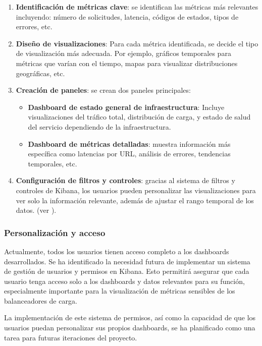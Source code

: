 \begin{enumerate}
    \item \textbf{Identificación de métricas clave}: se identifican las
    métricas más relevantes incluyendo: número de solicitudes, latencia,
	códigos de estados, tipos de errores, etc.

    \item \textbf{Diseño de visualizaciones}: Para cada métrica identificada,
    se decide el tipo de visualización más adecuada. Por ejemplo, gráficos
	temporales para métricas que varían con el tiempo, mapas para visualizar
	distribuciones geográficas, etc.

    \item \textbf{Creación de paneles}: se crean dos paneles principales:
    \begin{itemize}
        \item \textbf{Dashboard de estado general de infraestructura}: Incluye
        visualizaciones del tráfico total, distribución de carga, y estado de
        salud del servicio dependiendo de la infraestructura.
        \item \textbf{Dashboard de métricas detalladas}: muestra información
        más específica como latencias por URL, análisis de errores, tendencias
		temporales, etc.
    \end{itemize}

    \item \textbf{Configuración de filtros y controles}: gracias al sistema de
		filtros y controles de Kibana, los usuarios pueden personalizar las
		visualizaciones para ver solo la información relevante, además de
		ajustar el rango temporal de los datos. (ver ).
\end{enumerate}

\subsubsection{Personalización y acceso}
Actualmente, todos los usuarios tienen acceso completo a los dashboards
desarrollados. Se ha identificado la necesidad futura de implementar un sistema
de gestión de usuarios y permisos en Kibana. Esto permitirá asegurar que cada
usuario tenga acceso solo a los dashboards y datos relevantes para su función,
especialmente importante para la visualización de métricas sensibles de los
balanceadores de carga.

La implementación de este sistema de permisos, así como la capacidad de que los
usuarios puedan personalizar sus propios dashboards, se ha planificado como una
tarea para futuras iteraciones del proyecto.


